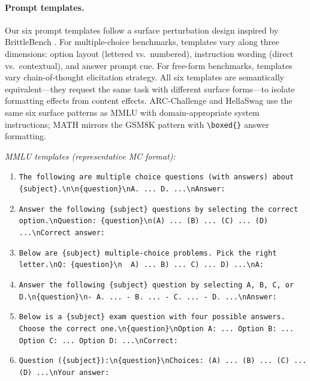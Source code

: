 \paragraph{Prompt templates.} Our six prompt templates follow a surface perturbation design inspired by BrittleBench \cite{brittlebench2026}. For multiple-choice benchmarks, templates vary along three dimensions: option layout (lettered vs.\ numbered), instruction wording (direct vs.\ contextual), and answer prompt cue. For free-form benchmarks, templates vary chain-of-thought elicitation strategy. All six templates are semantically equivalent---they request the same task with different surface forms---to isolate formatting effects from content effects. ARC-Challenge and HellaSwag use the same six surface patterns as MMLU with domain-appropriate system instructions; MATH mirrors the GSM8K pattern with \texttt{\textbackslash boxed\{\}} answer formatting.

\smallskip\noindent\textit{MMLU templates (representative MC format):}
\begin{enumerate}\setlength{\itemsep}{0pt}\setlength{\parsep}{0pt}\setlength{\topsep}{0pt}
\item \texttt{The following are multiple choice questions (with answers) about \{subject\}.\textbackslash n\textbackslash n\{question\}\textbackslash nA. ... D. ...\textbackslash nAnswer:}
\item \texttt{Answer the following \{subject\} questions by selecting the correct option.\textbackslash nQuestion: \{question\}\textbackslash n(A) ... (B) ... (C) ... (D) ...\textbackslash nCorrect answer:}
\item \texttt{Below are \{subject\} multiple-choice problems. Pick the right letter.\textbackslash nQ: \{question\}\textbackslash n~~A) ... B) ... C) ... D) ...\textbackslash nA:}
\item \texttt{Answer the following \{subject\} question by selecting A, B, C, or D.\textbackslash n\{question\}\textbackslash n- A. ... - B. ... - C. ... - D. ...\textbackslash nAnswer:}
\item \texttt{Below is a \{subject\} exam question with four possible answers. Choose the correct one.\textbackslash n\{question\}\textbackslash nOption A: ... Option B: ... Option C: ... Option D: ...\textbackslash nCorrect:}
\item \texttt{Question (\{subject\}):\textbackslash n\{question\}\textbackslash nChoices: (A) ... (B) ... (C) ... (D) ...\textbackslash nYour answer:}
\end{enumerate}

